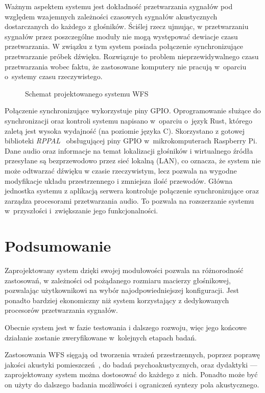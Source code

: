 \documentclass[10pt, a4paper]{article}
\let\Oldsection\section
\renewcommand{\section}{\FloatBarrier\Oldsection}
\begin{document}
Ważnym aspektem systemu jest dokładność przetwarzania sygnałów pod względem
wzajemnych zależności czasowych sygnałów akustycznych dostarczanych do każdego
z głośników.  Ściślej rzecz ujmując, w przetwarzaniu sygnałów przez
poszczególne moduły nie mogą występować dewiacje czasu przetwarzania. W związku
z tym system posiada połączenie synchronizujące przetwarzanie próbek dźwięku.
Rozwiązuje to problem nieprzewidywalnego czasu przetwarzania wobec faktu, że
zastosowane komputery nie pracują w~oparciu o~systemy czasu rzeczywistego.

\begin{figure}[H]
  \centering
  \caption{Schemat projektowanego systemu WFS}
  \label{fig:schemat}
\end{figure}

Połączenie synchronizujące wykorzystuje piny GPIO. Oprogramowanie służące do
synchronizacji oraz kontroli systemu napisano w~oparciu o~język Rust, którego
zaletą jest wysoka wydajność (na poziomie języka C). Skorzystano z gotowej
biblioteki \emph{RPPAL}~\cite{RPPAL} obsługującej piny GPIO w~mikrokomputerach
Raspberry Pi. Dane audio oraz informacje na temat lokalizacji głośników i
wirtualnego źródła przesyłane są bezprzewodowo przez sieć lokalną (LAN), co
oznacza, że system nie może odtwarzać dźwięku w czasie rzeczywistym, lecz
pozwala na wygodne modyfikacje układu przestrzennego i zmniejsza ilość
przewodów. Główna jednostka systemu z aplikacją serwera kontroluje połączenie
synchronizujące oraz zarządza procesorami przetwarzania audio. To pozwala na rozszerzanie
systemu w~przyszłości i~zwiększanie jego funkcjonalności.

\section{Podsumowanie}

Zaprojektowany system dzięki swojej modułowości pozwala na różnorodność
zastosowań, w zależności od pożądanego rozmiaru macierzy głośnikowej,
pozwalając użytkownikowi na wybór najodpowiedniejszej konfiguracji. Jest
ponadto bardziej ekonomiczny niż system korzystający z dedykowanych procesorów
przetwarzania sygnałów.

Obecnie system jest w fazie testowania i dalszego rozwoju, więc jego końcowe
działanie zostanie zweryfikowane w~kolejnych etapach badań.

Zastosowania WFS sięgają od tworzenia wrażeń przestrzennych, poprzez poprawę
jakości akustyki pomieszczeń~\cite{enhancement}, do badań psychoakustycznych,
oraz dydaktyki --- zaprojektowany system można dostosować do każdego z~nich.
Ponadto może być on użyty do dalszego badania możliwości i ograniczeń syntezy
pola akustycznego.

\printbibliography
\end{document}
